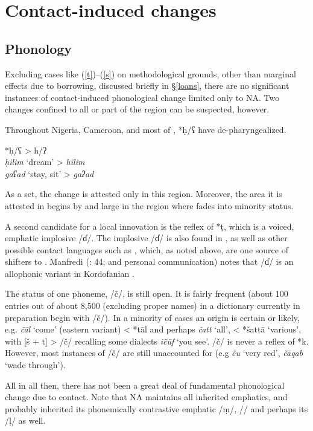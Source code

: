 \documentclass[output=paper]{langsci/langscibook}
\begin{document}
\section{Contact-induced changes
}

\subsection{Phonology}
\label{phon}

Excluding cases like (\ref{t})–(\ref{s}) on methodological grounds, other than marginal effects due to borrowing, discussed briefly in §\ref{loans}, there are no significant instances of contact-induced phonological change limited only to NA. Two changes confined to all or part of the  region can be suspected, however.

Throughout Nigeria, Cameroon, and most of  , *ḥ/ʕ have de-{pharyngealized}.

\ea
*\textup{ḥ/ʕ} > h/ʔ\\
         \textit{ḥilim} ‘dream’ > \textit{hilim}\\
        \textit{gaʕad} ‘stay, sit’ > \textit{gaʔad}
\z

As a set, the change is attested only in this region. Moreover, the area it is attested in begins by and large in the region where  fades into minority status.


A second candidate for a local  innovation is the reflex of *ṭ, which is a voiced, {emphatic} implosive /ɗ/. The implosive /ɗ/ is also found in , as well as other possible contact languages such as , which, as noted above, are one source of shifters to . Manfredi (\citeyear{Manfredi2010}: 44; and personal communication) notes that /ɗ/ is an allophonic variant in Kordofanian  .

The status of one {phoneme}, /č/, is still open. It is fairly frequent (about 100 entries out of about 8,500 (excluding proper names) in a dictionary currently in preparation begin with /č/). In a minority of cases an  origin is certain or likely, e.g. \textit{čāl} ‘come’ (eastern variant) < *tāl and perhaps \textit{čatt} ‘all’, < *šattā ‘various’, with [š + t] > /č/ recalling some  dialects \textit{ičūf} ‘you see’. /č/ is never a reflex of *k. However, most instances of /č/ are still unaccounted for (e.g \textit{ču} ‘very red’, \textit{čāqab} ‘wade through’).

All in all then, there has not been a great deal of fundamental phonological change due to contact. Note that NA maintains all inherited emphatics, and probably inherited its phonemically contrastive {emphatic} /ṃ/, /{\R}/ and perhaps its /ḷ/ as well.
\end{document}
